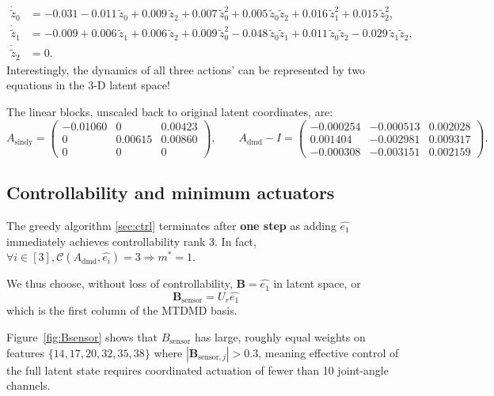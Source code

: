 \documentclass[11pt]{article}
\begin{document}
\begin{align}
  \dot{\tilde{z}}_0 &= -0.031 - 0.011\,\tilde{z}_0 + 0.009\,\tilde{z}_2
    + 0.007\,\tilde{z}_0^2 + 0.005\,\tilde{z}_0\tilde{z}_2
    + 0.016\,\tilde{z}_1^2 + 0.015\,\tilde{z}_2^2, \label{eq:sindy0}\\
  \dot{\tilde{z}}_1 &= -0.009 + 0.006\,\tilde{z}_1 + 0.006\,\tilde{z}_2
    + 0.009\,\tilde{z}_0^2 - 0.048\,\tilde{z}_0\tilde{z}_1
    + 0.011\,\tilde{z}_0\tilde{z}_2 - 0.029\,\tilde{z}_1\tilde{z}_2, \label{eq:sindy1}\\
  \dot{\tilde{z}}_2 &= 0. \label{eq:sindy2}
\end{align}
Interestingly, the dynamics of all three actions' can be represented by two equations in the 3-D latent space!

The linear blocks, unscaled back to original latent coordinates, are:
\begin{equation}
  A_{\mathrm{sindy}} =
  \begin{pmatrix}
    -0.01060 & 0 & 0.00423 \\
    0 & 0.00615 & 0.00860 \\
    0 & 0 & 0
  \end{pmatrix},
  \qquad
  A_{\mathrm{dmd}} - I =
  \begin{pmatrix}
    -0.000254 & -0.000513 & 0.002028 \\
     0.001404 & -0.002981 & 0.009317 \\
    -0.000308 & -0.003151 & 0.002159
  \end{pmatrix}.
  \label{eq:A-compare}
\end{equation}

\subsection{Controllability and minimum actuators}

The greedy algorithm \ref{sec:ctrl} terminates after \textbf{one step} as adding $\hat{e_1}$ immediately
achieves controllability rank 3. In fact, $\forall i \in [3], \mathcal{C}(A_\mathrm{dmd}, \hat{e_i}) = 3 \Rightarrow \boxed{m^* = 1.}$

We thus choose, without loss of controllability, $\mathbf{B} = \hat{e_1}$ in latent space, or
$$\mathbf{B}_{\mathrm{sensor}} = U_r \hat{e_1}$$
which is the first column of the MTDMD basis.

Figure~\ref{fig:Bsensor} shows that
$B_{\mathrm{sensor}}$ has large, roughly equal weights on features $\{14, 17, 20, 32, 35, 38\}$
where $\left| \mathbf{B}_{{\mathrm{sensor}}, j} \right| > 0.3$, meaning effective control of the full latent state
requires coordinated actuation of fewer than 10 joint-angle channels.
\end{document}
